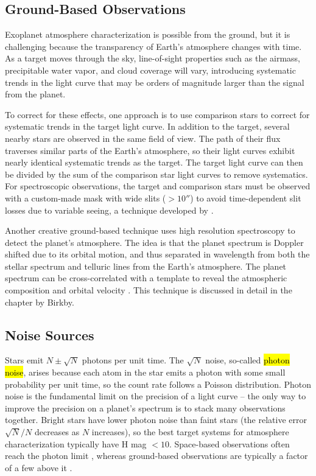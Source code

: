 \documentclass[graybox,natbib,nosecnum]{svmult}
\newcommand{\hbindex}[1]{\hl{#1}\index{#1}}  %
\begin{document}
\subsection{Ground-Based Observations}
Exoplanet atmosphere characterization is possible from the ground, but it is challenging because
the transparency of Earth's atmosphere changes with time.  As a target moves through the sky, line-of-sight properties such as the airmass, precipitable water vapor, and cloud coverage will vary, introducing systematic trends in the light curve that may be orders of magnitude larger than the signal from the planet. 

To correct for these effects, one approach is to use comparison stars to correct for systematic trends in the target light curve. In addition to the target, several nearby stars are observed in the same field of view. The path of their flux traverses similar parts of the Earth's atmosphere, so their light curves exhibit nearly identical systematic trends as the target. The target light curve can then be divided by the sum of the comparison star light curves to remove systematics.  For spectroscopic observations, the target and comparison stars must be observed with a custom-made mask with wide slits ($>10''$) to avoid time-dependent slit losses due to variable seeing, a technique developed by \cite{bean10}.

Another creative ground-based technique uses high resolution spectroscopy to detect the planet's atmosphere.  The idea is that the planet spectrum is Doppler shifted due to its orbital motion, and thus separated in wavelength from both the stellar spectrum and telluric lines from the Earth's atmosphere. The planet spectrum can be cross-correlated with a template to reveal the atmospheric composition and orbital velocity \citep[e.g.][]{snellen10}.  This technique is discussed in detail in the chapter by Birkby. 

\subsection{Noise Sources}
Stars emit $N \pm \sqrt{N}$ photons per unit time. The $\sqrt{N}$ noise, so-called \hbindex{photon noise}, arises because each atom in the star emits a photon with some small probability per unit time, so the count rate follows a Poisson distribution. Photon noise is the fundamental limit on the precision of a light curve -- the only way to improve the precision on a planet's spectrum is to stack many observations together. Bright stars have lower photon noise than faint stars (the relative error $\sqrt{N}/N$ decreases as $N$ increases), so the best target systems for atmosphere characterization typically have H mag $< 10$.  Space-based observations often reach the photon limit \citep{sing11, kreidberg14a, ingalls16}, whereas ground-based observations are typically a factor of a few above it \citep[e.g.][]{bean13}. 
\end{document}
